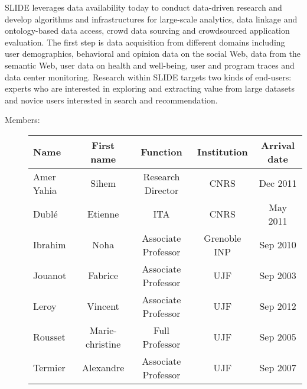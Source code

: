SLIDE leverages data availability today to conduct data-driven research and develop algorithms
and infrastructures for large-scale analytics, data linkage and ontology-based data access, crowd
data sourcing and crowdsourced application evaluation. The first step is data acquisition from different
domains including user demographics, behavioral and opinion data on the social Web, data from the
semantic Web, user data on health and well-being, user and program traces and data center monitoring.
Research within SLIDE targets two kinds of end-users: experts who are interested in exploring
and extracting value from large datasets and novice users interested in search and recommendation.

\begin{description}

\item[Members:] 

\begin{center}\begin{tabular}{|p{2.5cm}|*{4}{c|}}
\hline 
Name & First name & Function & Institution & Arrival date\\\hline \hline %
Amer Yahia & Sihem & Research Director & CNRS & Dec 2011  \\\hline
Dubl{\'e} & Etienne & ITA  & CNRS & May 2011\\\hline
Ibrahim & Noha & Associate Professor & Grenoble INP & Sep 2010  \\\hline
Jouanot & Fabrice & Associate Professor & UJF & Sep 2003 \\\hline
Leroy & Vincent & Associate Professor & UJF & Sep 2012 \\\hline
Rousset & Marie-christine & Full Professor & UJF & Sep 2005 \\\hline
Termier & Alexandre & Associate Professor & UJF & Sep 2007 \\\hline
\hline
\end{tabular}\end{center}
\makeatother


\end{description}

